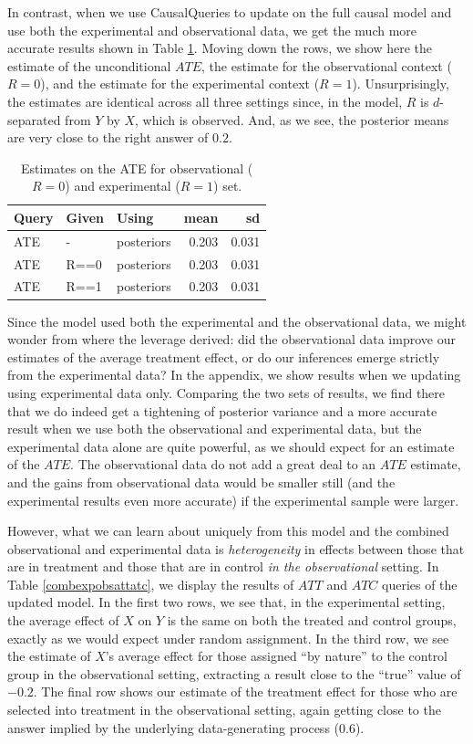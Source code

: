 \documentclass[
  12pt,
]{book}
\begin{document}
In contrast, when we use CausalQueries to update on the full causal model and use both the experimental and observational data, we get the much more accurate results shown in Table \ref{tab:fusionCQ}. Moving down the rows, we show here the estimate of the unconditional \(ATE\), the estimate for the observational context (\(R=0\)), and the estimate for the experimental context (\(R=1\)). Unsurprisingly, the estimates are identical across all three settings since, in the model, \(R\) is \(d\)-separated from \(Y\) by \(X\), which is observed. And, as we see, the posterior means are very close to the right answer of \(0.2\).

\begin{table}

\caption{\label{tab:fusionCQ}Estimates on the ATE for observational ($R=0$) and experimental ($R=1$) set.}
\centering
\begin{tabular}[t]{l|l|l|r|r}
\hline
Query & Given & Using & mean & sd\\
\hline
ATE & - & posteriors & 0.203 & 0.031\\
\hline
ATE & R==0 & posteriors & 0.203 & 0.031\\
\hline
ATE & R==1 & posteriors & 0.203 & 0.031\\
\hline
\end{tabular}
\end{table}

Since the model used both the experimental and the observational data, we might wonder from where the leverage derived: did the observational data improve our estimates of the average treatment effect, or do our inferences emerge strictly from the experimental data? In the appendix, we show results when we updating using experimental data only.
Comparing the two sets of results, we find there that we do indeed get a tightening of posterior variance and a more accurate result when we use both the observational and experimental data, but the experimental data alone are quite powerful, as we should expect for an estimate of the \(ATE\). The observational data do not add a great deal to an \(ATE\) estimate, and the gains from observational data would be smaller still (and the experimental results even more accurate) if the experimental sample were larger.

However, what we can learn about uniquely from this model and the combined observational and experimental data is \emph{heterogeneity} in effects between those that are in treatment and those that are in control \emph{in the observational} setting. In Table \ref{combexpobsattatc}, we display the results of \(ATT\) and \(ATC\) queries of the updated model. In the first two rows, we see that, in the experimental setting, the average effect of \(X\) on \(Y\) is the same on both the treated and control groups, exactly as we would expect under random assignment. In the third row, we see the estimate of \(X\)'s average effect for those assigned ``by nature'' to the control group in the observational setting, extracting a result close to the ``true'' value of \(-0.2\). The final row shows our estimate of the treatment effect for those who are selected into treatment in the observational setting, again getting close to the answer implied by the underlying data-generating process (\(0.6\)).
\end{document}
